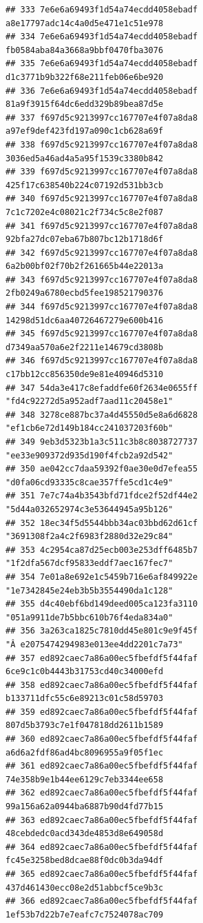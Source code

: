 \documentclass[]{article}
\begin{document}
\begin{verbatim}
## 333 7e6e6a69493f1d54a74ecdd4058ebadf     a8e17797adc14c4a0d5e471e1c51e978
## 334 7e6e6a69493f1d54a74ecdd4058ebadf     fb0584aba84a3668a9bbf0470fba3076
## 335 7e6e6a69493f1d54a74ecdd4058ebadf     d1c3771b9b322f68e211feb06e6be920
## 336 7e6e6a69493f1d54a74ecdd4058ebadf     81a9f3915f64dc6edd329b89bea87d5e
## 337 f697d5c9213997cc167707e4f07a8da8     a97ef9def423fd197a090c1cb628a69f
## 338 f697d5c9213997cc167707e4f07a8da8     3036ed5a46ad4a5a95f1539c3380b842
## 339 f697d5c9213997cc167707e4f07a8da8     425f17c638540b224c07192d531bb3cb
## 340 f697d5c9213997cc167707e4f07a8da8     7c1c7202e4c08021c2f734c5c8e2f087
## 341 f697d5c9213997cc167707e4f07a8da8     92bfa27dc07eba67b807bc12b1718d6f
## 342 f697d5c9213997cc167707e4f07a8da8     6a2b00bf02f70b2f261665b44e22013a
## 343 f697d5c9213997cc167707e4f07a8da8     2fb0249a6780ecbd5fee198521790376
## 344 f697d5c9213997cc167707e4f07a8da8     14298d51dc6aa40726467279e600b416
## 345 f697d5c9213997cc167707e4f07a8da8     d7349aa570a6e2f2211e14679cd3808b
## 346 f697d5c9213997cc167707e4f07a8da8     c17bb12cc856350de9e81e40946d5310
## 347 54da3e417c8efaddfe60f2634e0655ff   "fd4c92272d5a952adf7aad11c20458e1"
## 348 3278ce887bc37a4d45550d5e8a6d6828   "ef1cb6e72d149b184cc241037203f60b"
## 349 9eb3d5323b1a3c511c3b8c8038727737   "ee33e909372d935d190f4fcb2a92d542"
## 350 ae042cc7daa59392f0ae30e0d7efea55   "d0fa06cd93335c8cae357ffe5cd1c4e9"
## 351 7e7c74a4b3543bfd71fdce2f52df44e2   "5d44a032652974c3e53644945a95b126"
## 352 18ec34f5d5544bbb34ac03bbd62d61cf   "3691308f2a4c2f6983f2880d32e29c84"
## 353 4c2954ca87d25ecb003e253dff6485b7   "1f2dfa567dcf95833eddf7aec167fec7"
## 354 7e01a8e692e1c5459b716e6af849922e   "1e7342845e24eb3b5b3554490da1c128"
## 355 d4c40ebf6bd149deed005ca123fa3110   "051a9911de7b5bbc610b76f4eda834a0"
## 356 3a263ca1825c7810dd45e801c9e9f45f "Â e2075474294983e013ee4dd2201c7a73"
## 357 ed892caec7a86a00ec5fbefdf5f44faf     6ce9c1c0b4443b31753cd40c34000efd
## 358 ed892caec7a86a00ec5fbefdf5f44faf     b133711dfc55c6e89213c01c58d59703
## 359 ed892caec7a86a00ec5fbefdf5f44faf     807d5b3793c7e1f047818dd2611b1589
## 360 ed892caec7a86a00ec5fbefdf5f44faf     a6d6a2fdf86ad4bc8096955a9f05f1ec
## 361 ed892caec7a86a00ec5fbefdf5f44faf     74e358b9e1b44ee6129c7eb3344ee658
## 362 ed892caec7a86a00ec5fbefdf5f44faf     99a156a62a0944ba6887b90d4fd77b15
## 363 ed892caec7a86a00ec5fbefdf5f44faf     48cebdedc0acd343de4853d8e649058d
## 364 ed892caec7a86a00ec5fbefdf5f44faf     fc45e3258bed8dcae88f0dc0b3da94df
## 365 ed892caec7a86a00ec5fbefdf5f44faf     437d461430ecc08e2d51abbcf5ce9b3c
## 366 ed892caec7a86a00ec5fbefdf5f44faf     1ef53b7d22b7e7eafc7c7524078ac709

\end{verbatim}
\end{document}
